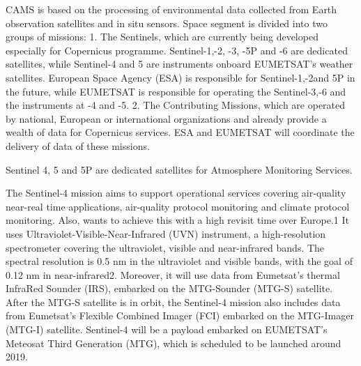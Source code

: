 \documentclass[9pt]{report}
\begin{document}
\noindent{}CAMS is based on the processing of environmental data collected from Earth observation satellites and in situ sensors.
Space segment is divided into two groups of missions:
1. The Sentinels, which are currently being developed especially for Copernicus programme. Sentinel-1,-2, -3, -5P and -6 are dedicated satellites, while Sentinel-4 and 5 are instruments onboard EUMETSAT’s weather satellites. European Space Agency (ESA) is responsible for Sentinel-1,-2and 5P in the future, while EUMETSAT is responsible for operating the Sentinel-3,-6 and the instruments at -4 and -5.
2. The Contributing Missions, which are operated by national, European or international organizations and already provide a wealth of data for Copernicus services. ESA and EUMETSAT will coordinate the delivery of data of these missions.%

Sentinel 4, 5 and 5P are dedicated satellites for Atmosphere Monitoring Services.%

The Sentinel-4 mission aims to support operational services covering air-quality near-real time applications, air-quality protocol monitoring and climate protocol monitoring. Also, wants to achieve this with a high revisit time over Europe.1 It uses Ultraviolet-Visible-Near-Infrared (UVN) instrument, a high-resolution spectrometer covering the ultraviolet, visible and near-infrared bands. The spectral resolution is 0.5 nm in the ultraviolet and visible bands, with the goal of 0.12 nm in near-infrared2. Moreover, it will use data from Eumetsat's thermal InfraRed Sounder (IRS), embarked on the MTG-Sounder (MTG-S) satellite. After the MTG-S satellite is in orbit, the Sentinel-4 mission also includes data from Eumetsat's Flexible Combined Imager (FCI) embarked on the MTG-Imager (MTG-I) satellite. Sentinel-4 will be a payload embarked on EUMETSAT's Meteosat Third Generation (MTG), which is scheduled to be launched around 2019.%
\end{document}
